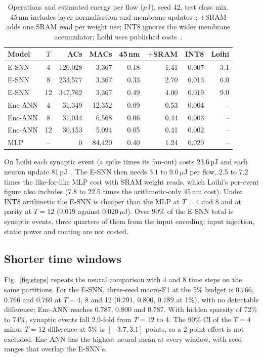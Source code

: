 \documentclass[conference]{IEEEtran}
\begin{document}
\begin{table}[t]
\centering
\caption{Operations and estimated energy per flow ($\mu$J), seed 42, test class mix. 45\,nm includes layer normalisation and membrane updates~\cite{horowitz2014}; +SRAM adds one SRAM read per weight use; INT8 ignores the wider membrane accumulator; Loihi uses published costs~\cite{davies2018}.}
\label{tab:loihi}
\small
\setlength{\tabcolsep}{2pt}
\begin{tabular}{lcrrrrrr}
\toprule
Model & $T$ & ACs & MACs & 45\,nm & +SRAM & INT8 & Loihi \\
\midrule
E-SNN & 4 & 120{,}028 & 3{,}367 & 0.18 & 1.41 & 0.007 & 3.1 \\
E-SNN & 8 & 233{,}577 & 3{,}367 & 0.33 & 2.70 & 0.013 & 6.0 \\
E-SNN & 12 & 347{,}762 & 3{,}367 & 0.49 & 4.00 & 0.019 & 9.0 \\
Enc-ANN & 4 & 31{,}349 & 12{,}352 & 0.09 & 0.53 & 0.004 & -- \\
Enc-ANN & 8 & 31{,}034 & 6{,}568 & 0.06 & 0.44 & 0.003 & -- \\
Enc-ANN & 12 & 30{,}153 & 5{,}094 & 0.05 & 0.41 & 0.002 & -- \\
MLP & -- & 0 & 84{,}420 & 0.40 & 1.24 & 0.020 & -- \\
\bottomrule
\end{tabular}
\end{table}

On Loihi each synaptic event (a spike times its fan-out) costs 23.6\,pJ and each neuron update 81\,pJ~\cite{davies2018}. The E-SNN then needs 3.1 to 9.0\,$\mu$J per flow, 2.5 to 7.2 times the like-for-like MLP cost with SRAM weight reads, which Loihi's per-event figure also includes (7.8 to 22.5 times the arithmetic-only 45\,nm cost). Under INT8 arithmetic the E-SNN is cheaper than the MLP at $T = 4$ and 8 and at parity at $T = 12$ (0.019 against 0.020\,$\mu$J). Over 90\% of the E-SNN total is synaptic events, three quarters of them from the input encoding; input injection, static power and routing are not costed.

\subsection{Shorter time windows}

Fig.~\ref{fig:steps} repeats the neural comparison with 4 and 8 time steps on the same partitions. For the E-SNN, three-seed macro-F1 at the 5\% budget is $0.766$, $0.766$ and $0.769$ at $T = 4$, 8 and 12 ($0.791$, $0.800$, $0.789$ at 1\%), with no detectable difference; Enc-ANN reaches $0.787$, $0.800$ and $0.787$. With hidden sparsity of 72\% to 74\%, synaptic events fall 2.9-fold from $T = 12$ to 4. The 90\% CI of the $T = 4$ minus $T = 12$ difference at 5\% is $[-3.7, 3.1]$ points, so a 2-point effect is not excluded. Enc-ANN has the highest neural mean at every window, with seed ranges that overlap the E-SNN's.
\end{document}
